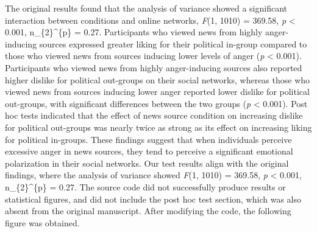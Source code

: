 \documentclass[
  man]{apa6}
\begin{document}
\begin{enumerate}
  The original results found that the analysis of variance showed a significant interaction between conditions and online networks, \emph{F}(1, 1010) = 369.58, \emph{p} \textless{} 0.001, n\_\{2\}\^{}\{p\} = 0.27. Participants who viewed news from highly anger-inducing sources expressed greater liking for their political in-group compared to those who viewed news from sources inducing lower levels of anger (\emph{p} \textless{} 0.001). Participants who viewed news from highly anger-inducing sources also reported higher dislike for political out-groups on their social networks, whereas those who viewed news from sources inducing lower anger reported lower dislike for political out-groups, with significant differences between the two groups (\emph{p} \textless{} 0.001). Post hoc tests indicated that the effect of news source condition on increasing dislike for political out-groups was nearly twice as strong as its effect on increasing liking for political in-groups. These findings suggest that when individuals perceive excessive anger in news sources, they tend to perceive a significant emotional polarization in their social networks. Our test results align with the original findings, where the analysis of variance showed \emph{F}(1, 1010) = 369.58, \emph{p} \textless{} 0.001, n\_\{2\}\^{}\{p\} = 0.27. The source code did not successfully produce results or statistical figures, and did not include the post hoc test section, which was also absent from the original manuscript. After modifying the code, the following figure was obtained.


\end{enumerate}
\end{document}
